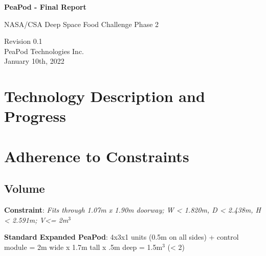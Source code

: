 \documentclass{../tex/report}
\begin{document}
\begin{titlepage}
    \begin{center}
        \vspace*{1.2cm}

        \textbf{\large{PeaPod - Final Report}}

        \vspace{0.5cm}

        NASA/CSA Deep Space Food Challenge Phase 2

        \vfill
        
        \vspace{.75cm}

        Revision 0.1\\
        PeaPod Technologies Inc.\\
        January 10th, 2022

    \end{center}
\end{titlepage}

\thispagestyle{plain}

\tableofcontents
\newpage

\section{Technology Description and Progress}




\section{Adherence to Constraints}

\subsection{Volume}

\textbf{Constraint}: \textit{Fits through 1.07m x 1.90m doorway; W < 1.820m, D < 2.438m, H < 2.591m; V<= 2m${}^3$}

\textbf{Standard Expanded PeaPod}: 4x3x1 units (0.5m on all sides) + control module = 2m wide x 1.7m tall x .5m deep = 1.5m${}^3$ (< 2)
\end{document}
